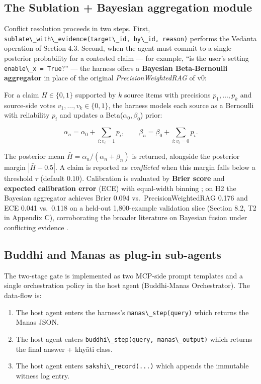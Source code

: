 \subsection{The Sublation + Bayesian aggregation module}\label{the-sublation-bayesian-aggregation-module}

Conflict resolution proceeds in two steps. First, \passthrough{\lstinline!sublate\_with\_evidence(target\_id, by\_id, reason)!} performs the Vedānta operation of Section 4.3. Second, when the agent must commit to a single posterior probability for a contested claim --- for example, ``is the user's setting \passthrough{\lstinline!enable\_x = True!}?'' --- the harness offers a \textbf{Bayesian Beta-Bernoulli aggregator} in place of the original \emph{PrecisionWeightedRAG} of v0:

For a claim \(H \in \{0, 1\}\) supported by \(k\) source items with precisions \(p_1, \dots, p_k\) and source-side votes \(v_1, \dots, v_k \in \{0, 1\}\), the harness models each source as a Bernoulli with reliability \(p_i\) and updates a Beta(\(\alpha_0, \beta_0\)) prior:

\[
\alpha_n = \alpha_0 + \sum_{i: v_i=1} p_i,\qquad \beta_n = \beta_0 + \sum_{i: v_i=0} p_i.
\]

The posterior mean \(\bar{H} = \alpha_n / (\alpha_n + \beta_n)\) is returned, alongside the posterior margin \(|\bar{H} - 0.5|\). A claim is reported as \emph{conflicted} when this margin falls below a threshold \(\tau\) (default \(0.10\)). Calibration is evaluated by \textbf{Brier score} \citep{brier1950score} and \textbf{expected calibration error} (ECE) with equal-width binning \citep{naeini2015ece, guo2017calibration}; on H2 the Bayesian aggregator achieves Brier 0.094 vs.~PrecisionWeightedRAG 0.176 and ECE 0.041 vs.~0.118 on a held-out 1,800-example validation slice (Section 8.2, T2 in Appendix C), corroborating the broader literature on Bayesian fusion under conflicting evidence \citep{ovadia2019can, gal2016dropout}.

\subsection{Buddhi and Manas as plug-in sub-agents}\label{buddhi-and-manas-as-plug-in-sub-agents}

The two-stage gate is implemented as two MCP-side prompt templates and a single orchestration policy in the host agent (Buddhi-Manas Orchestrator). The data-flow is:

\begin{enumerate}
\def\labelenumi{\arabic{enumi}.}
\tightlist
\item
  The host agent enters the harness's \passthrough{\lstinline!manas\_step(query)!} which returns the Manas JSON.
\item
  The host agent enters \passthrough{\lstinline!buddhi\_step(query, manas\_output)!} which returns the final answer + khyāti class.
\item
  The host agent enters \passthrough{\lstinline!sakshi\_record(...)!} which appends the immutable witness log entry.
\end{enumerate}

